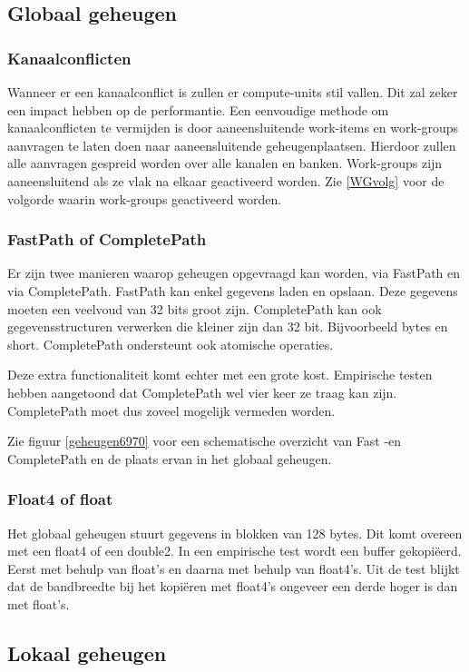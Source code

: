 \subsection{Globaal geheugen}
\subsubsection{Kanaalconflicten}
Wanneer er een kanaalconflict is zullen er compute-units stil vallen. Dit zal zeker een impact hebben op de performantie. Een eenvoudige methode om kanaalconflicten te vermijden is door aaneensluitende work-items en work-groups aanvragen te laten doen naar aaneensluitende geheugenplaatsen. Hierdoor zullen alle aanvragen gespreid worden over alle kanalen en banken. Work-groups zijn aaneensluitend als ze vlak na elkaar geactiveerd worden. Zie \ref{WGvolg} voor de volgorde waarin work-groups geactiveerd worden. 

\subsubsection{FastPath of CompletePath}
Er zijn twee manieren waarop geheugen opgevraagd kan worden, via FastPath en via CompletePath. FastPath kan enkel gegevens laden en opslaan. Deze gegevens moeten een veelvoud van 32 bits groot zijn. CompletePath kan ook gegevensstructuren verwerken die kleiner zijn dan 32 bit. Bijvoorbeeld bytes en short. CompletePath ondersteunt ook atomische operaties.

Deze extra functionaliteit komt echter met een grote kost. Empirische testen \cite[p.~6-3]{amd} hebben aangetoond dat CompletePath wel vier keer ze traag kan zijn. CompletePath moet dus zoveel mogelijk vermeden worden.

Zie figuur \ref{geheugen6970} voor een schematische overzicht van Fast -en CompletePath en de plaats ervan in het globaal geheugen.

\subsubsection{Float4 of float}
Het globaal geheugen stuurt gegevens in blokken van 128 bytes. Dit komt overeen met een float4 of een double2. In een empirische test wordt een buffer gekopi\"eerd. Eerst met behulp van float's en daarna met behulp van float4's. Uit de test blijkt dat de bandbreedte bij het kopi\"eren met float4's ongeveer een derde hoger is dan met float's. \cite[p.~6-11]{amd}

\subsection{Lokaal geheugen}
